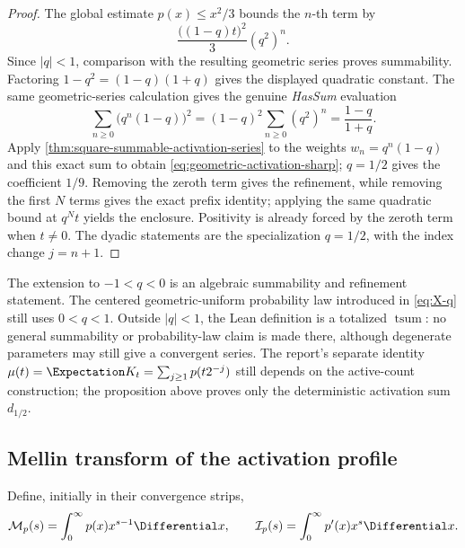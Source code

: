 \documentclass[11pt,oneside]{article}
\theoremstyle{definition}
\theoremstyle{remark}
\newcommand{\Ical}{\mathcal I}
\newcommand{\Mcal}{\mathcal M}
\begin{document}
\begin{proof}
The global estimate $p(x)\le x^2/3$ bounds the $n$-th term by
\[
 \frac{\bigl((1-q)t\bigr)^2}{3}(q^2)^n.
\]
Since $|q|<1$, comparison with the resulting geometric series proves
summability.  Factoring $1-q^2=(1-q)(1+q)$ gives the displayed quadratic
constant.  The same geometric-series calculation gives the genuine
\emph{HasSum} evaluation
\[
 \sum_{n\ge0}\bigl(q^n(1-q)\bigr)^2
 =(1-q)^2\sum_{n\ge0}(q^2)^n
 =\frac{1-q}{1+q}.
\]
Apply \cref{thm:square-summable-activation-series} to the weights
$w_n=q^n(1-q)$ and this exact sum to obtain
\eqref{eq:geometric-activation-sharp}; $q=1/2$ gives the coefficient $1/9$.
Removing the zeroth term gives the refinement, while removing the
first $N$ terms gives the exact prefix identity; applying the same quadratic
bound at $q^Nt$ yields the enclosure.  Positivity is already forced by the
zeroth term when $t\ne0$.  The dyadic statements are the specialization
$q=1/2$, with the index change $j=n+1$.
\end{proof}

The extension to $-1<q<0$ is an algebraic summability and refinement
statement.  The centered geometric-uniform probability law introduced in
\eqref{eq:X-q} still uses $0<q<1$.  Outside $|q|<1$, the Lean definition is a
totalized $\operatorname{tsum}$: no general summability or probability-law
claim is made there, although degenerate parameters may still give a
convergent series.  The report's separate identity
$\mu(t)=\Expectation K_t=\sum_{j\ge1}p(t2^{-j})$ still depends on the active-count
construction; the proposition above proves only the deterministic activation
sum $d_{1/2}$.

\subsection{Mellin transform of the activation profile}

Define, initially in their convergence strips,
\begin{equation}
 \Mcal_p(s)=\int_0^\infty p(x)x^{s-1}\Differential x,
 \qquad
 \Ical_p(s)=\int_0^\infty p'(x)x^s\Differential x.
 \label{eq:Mellin-p-def}
\end{equation}
\end{document}
